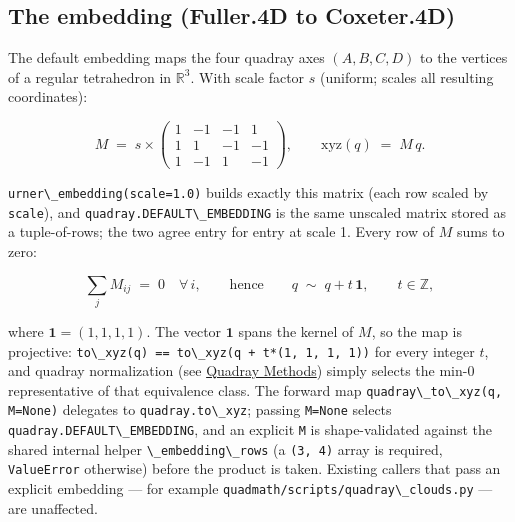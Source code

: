 \documentclass[
  10pt,
]{article}
\newcommand{\passthrough}[1]{#1}
\begin{document}
\subsection{The embedding (Fuller.4D to
Coxeter.4D)}\label{the-embedding-fuller.4d-to-coxeter.4d}

The default embedding maps the four quadray axes \((A, B, C, D)\) to the
vertices of a regular tetrahedron in \(\mathbb{R}^3\). With scale factor
\(s\) (uniform; scales all resulting coordinates):

\begin{equation}
\label{eq:conv-embedding}
M \;=\; s \times
\begin{pmatrix}
 1 & -1 & -1 &  1 \\
 1 &  1 & -1 & -1 \\
 1 & -1 &  1 & -1
\end{pmatrix},
\qquad \mathrm{xyz}(q) \;=\; M\,q .
\end{equation}

\passthrough{\lstinline!urner\_embedding(scale=1.0)!} builds exactly
this matrix (each row scaled by \passthrough{\lstinline!scale!}), and
\passthrough{\lstinline!quadray.DEFAULT\_EMBEDDING!} is the same
unscaled matrix stored as a tuple-of-rows; the two agree entry for entry
at scale 1. Every row of \(M\) sums to zero:

\begin{equation}
\label{eq:conv-fiber}
\textstyle\sum_{j} M_{ij} \;=\; 0 \quad \forall\, i,
\qquad \text{hence} \qquad
q \;\sim\; q + t\,\mathbf{1}, \qquad t \in \mathbb{Z},
\end{equation}

where \(\mathbf{1} = (1, 1, 1, 1)\). The vector \(\mathbf{1}\) spans the
kernel of \(M\), so the map is projective:
\passthrough{\lstinline!to\_xyz(q) == to\_xyz(q + t*(1, 1, 1, 1))!} for
every integer \(t\), and quadray normalization (see
\href{03_quadray_methods.md}{Quadray Methods}) simply selects the min-0
representative of that equivalence class. The forward map
\passthrough{\lstinline!quadray\_to\_xyz(q, M=None)!} delegates to
\passthrough{\lstinline!quadray.to\_xyz!}; passing
\passthrough{\lstinline!M=None!} selects
\passthrough{\lstinline!quadray.DEFAULT\_EMBEDDING!}, and an explicit
\passthrough{\lstinline!M!} is shape-validated against the shared
internal helper \passthrough{\lstinline!\_embedding\_rows!} (a
\passthrough{\lstinline!(3, 4)!} array is required,
\passthrough{\lstinline!ValueError!} otherwise) before the product is
taken. Existing callers that pass an explicit embedding --- for example
\passthrough{\lstinline!quadmath/scripts/quadray\_clouds.py!} --- are
unaffected.
\end{document}

